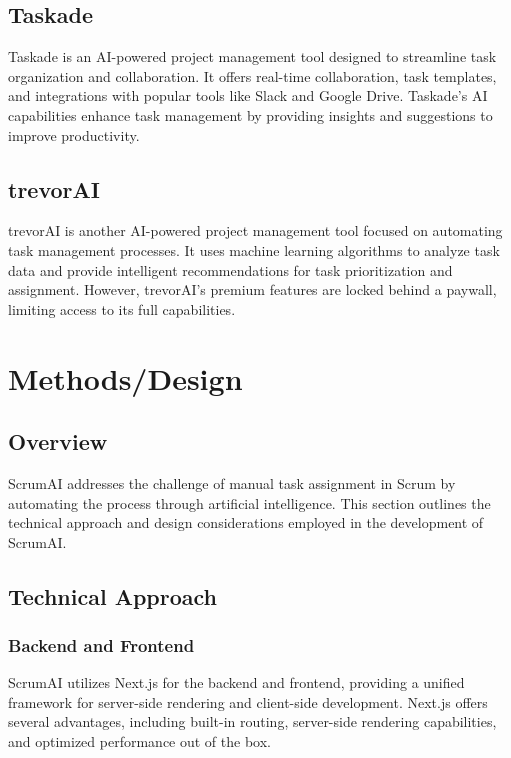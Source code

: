 \documentclass[conference]{IEEEtran}
\begin{document}
\subsection{Taskade}
Taskade is an AI-powered project management tool designed to streamline task organization and collaboration. It offers real-time collaboration, task templates, and integrations with popular tools like Slack and Google Drive. Taskade's AI capabilities enhance task management by providing insights and suggestions to improve productivity.

\subsection{trevorAI}
trevorAI is another AI-powered project management tool focused on automating task management processes. It uses machine learning algorithms to analyze task data and provide intelligent recommendations for task prioritization and assignment. However, trevorAI's premium features are locked behind a paywall, limiting access to its full capabilities.

\section{Methods/Design}

\subsection{Overview}
ScrumAI addresses the challenge of manual task assignment in Scrum by automating the process through artificial intelligence. This section outlines the technical approach and design considerations employed in the development of ScrumAI.

\subsection{Technical Approach}

\subsubsection{Backend and Frontend}
ScrumAI utilizes Next.js for the backend and frontend, providing a unified framework for server-side rendering and client-side development. Next.js offers several advantages, including built-in routing, server-side rendering capabilities, and optimized performance out of the box.
\end{document}
